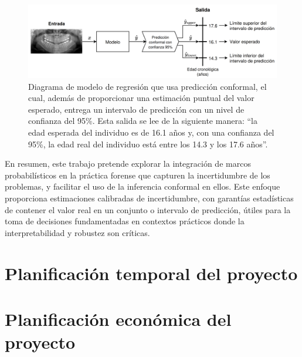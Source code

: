 \begin{figure}[h]
    \centering
    \includegraphics[width=\textwidth]{capitulos/cap_01/imagenes/example_intervalic_estimation.png}
    \caption[
        Diagrama de modelo de regresión que usa predicción conformal, el cual, además de proporcionar una estimación puntual del valor esperado, entrega un intervalo de predicción con un nivel de confianza del 95\%.
    ]{ 
        Diagrama de modelo de regresión que usa predicción conformal, el cual, además de proporcionar una estimación puntual del valor esperado, entrega un intervalo de predicción con un nivel de confianza del 95\%.
        Esta salida se lee de la siguiente manera: ``la edad esperada del individuo es de 16.1 años y, con una confianza del 95\%, la edad real del individuo está entre los 14.3 y los 17.6 años''.
    } 
    \label{fig:example_intervalic_estimation}
\end{figure}


En resumen, este trabajo pretende explorar la integración de marcos probabilísticos en la práctica forense que capturen la incertidumbre de los problemas, y facilitar el uso de la inferencia conformal en ellos. Este enfoque proporciona estimaciones calibradas de incertidumbre, con garantías estadísticas de contener el valor real en un conjunto o intervalo de predicción, útiles para la toma de decisiones fundamentadas en contextos prácticos donde la interpretabilidad y robustez son críticas.


\section{Planificación temporal del proyecto}



\section{Planificación económica del proyecto}

